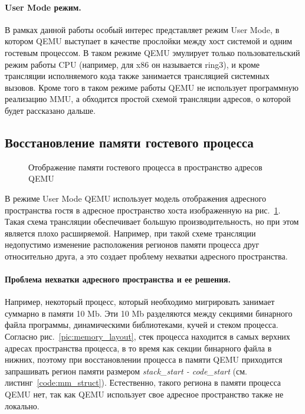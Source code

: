 \paragraph{User Mode режим.}

В рамках данной работы особый интерес представляет режим User Mode, в котором QEMU выступает в качестве прослойки между хост системой и одним гостевым процессом. В таком режиме QEMU эмулирует только пользовательский режим работы CPU (например, для x86 он называется ring3), и кроме трансляции исполняемого кода также занимается трансляцией системных вызовов. Кроме того в таком режиме работы QEMU не использует программную реализацию MMU, а обходится простой схемой трансляции адресов, о которой будет рассказано дальше.

\subsection{Восстановление памяти гостевого процесса}

\begin{figure}[h]
\caption{Отображение памяти гостевого процесса в пространство адресов QEMU}
\label{pic:qemu_memory_translation}
\end{figure}

В режиме User Mode QEMU использует модель отображения адресного пространства гостя в адресное пространство хоста изображенную на рис.~\ref{pic:qemu_memory_translation}. Такая схема трансляции обеспечивает большую производительность, но при этом является плохо расширяемой. Например, при такой схеме трансляции недопустимо изменение расположения регионов памяти процесса друг относительно друга, а это создает проблему нехватки адресного пространства.

\paragraph{Проблема нехватки адресного пространства и ее решения.}\label{nomem}

Например, некоторый процесс, который необходимо мигрировать занимает суммарно в памяти 10 Mb. Эти 10 Mb разделяются между секциями бинарного файла программы, динамическими библиотеками, кучей и стеком процесса. Согласно рис.~\ref{pic:memory_layout}, стек процесса находится в самых верхних адресах пространства процесса, в то время как секции бинарного файла в нижних, поэтому при восстановлении процесса в памяти QEMU приходится запрашивать регион памяти размером \textit{stack\_start - code\_start} (см. листинг~\ref{code:mm_struct}). Естественно, такого региона в памяти процесса QEMU нет, так как QEMU использует свое адресное пространство также не локально.

